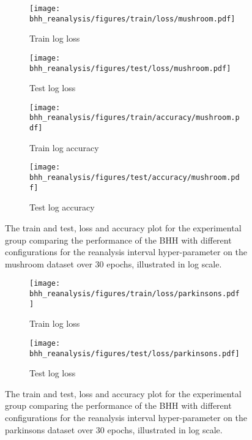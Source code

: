 \begin{figure}[htbp]
	\begin{subfigure}{0.5\textwidth}
		\centering
		\texttt{[image: bhh\_reanalysis/figures/train/loss/mushroom.pdf]}
		\caption{Train log loss}
		\label{fig:results:reanalysis:figures:loss:train:mushroom}
	\end{subfigure}
	\begin{subfigure}{0.5\textwidth}
		\centering
		\texttt{[image: bhh\_reanalysis/figures/test/loss/mushroom.pdf]}
		\caption{Test log loss}
		\label{fig:results:reanalysis:figures:loss:test:mushroom}
	\end{subfigure}
	\par\bigskip
	\begin{subfigure}{0.5\textwidth}
		\centering
		\texttt{[image: bhh\_reanalysis/figures/train/accuracy/mushroom.pdf]}
		\caption{Train log accuracy}
		\label{fig:results:reanalysis:figures:accuracy:train:mushroom}
	\end{subfigure}
	\begin{subfigure}{0.5\textwidth}
		\centering
		\texttt{[image: bhh\_reanalysis/figures/test/accuracy/mushroom.pdf]}
		\caption{Test log accuracy}
		\label{fig:results:reanalysis:figures:accuracy:test:mushroom}
	\end{subfigure}
	\par\bigskip
	\caption{The train and test, loss and accuracy plot for the experimental group comparing the performance of the \acs{BHH} with different configurations for the reanalysis interval hyper-parameter on the mushroom dataset over 30 epochs, illustrated in log scale.}
	\label{fig:results:reanalysis:figures:mushroom}
\end{figure}



\begin{figure}[htbp]
	\begin{subfigure}{0.5\textwidth}
		\centering
		\texttt{[image: bhh\_reanalysis/figures/train/loss/parkinsons.pdf]}
		\caption{Train log loss}
		\label{fig:results:reanalysis:figures:loss:train:parkinsons}
	\end{subfigure}
	\begin{subfigure}{0.5\textwidth}
		\centering
		\texttt{[image: bhh\_reanalysis/figures/test/loss/parkinsons.pdf]}
		\caption{Test log loss}
		\label{fig:results:reanalysis:figures:loss:test:parkinsons}
	\end{subfigure}
	\par\bigskip
	\caption{The train and test, loss and accuracy plot for the experimental group comparing the performance of the \acs{BHH} with different configurations for the reanalysis interval hyper-parameter on the parkinsons dataset over 30 epochs, illustrated in log scale.}
	\label{fig:results:reanalysis:figures:parkinsons}
\end{figure}


